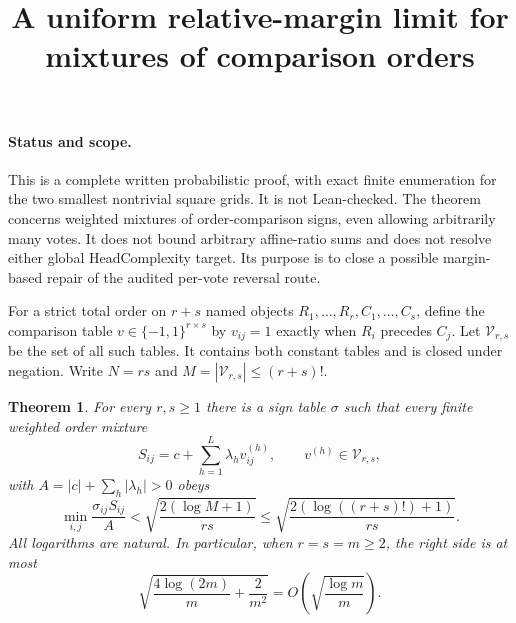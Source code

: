 \documentclass[11pt]{article}
\title{A uniform relative-margin limit for mixtures of comparison orders}
\author{}\date{}
\newtheorem{theorem}{Theorem}
\begin{document}
\maketitle

\paragraph{Status and scope.}
This is a complete written probabilistic proof, with exact finite
enumeration for the two smallest nontrivial square grids. It is not
Lean-checked. The theorem concerns weighted mixtures of order-comparison
signs, even allowing arbitrarily many votes. It does not bound arbitrary
affine-ratio sums and does not resolve either global HeadComplexity target.
Its purpose is to close a possible margin-based repair of the audited
per-vote reversal route.

For a strict total order on $r+s$ named objects
$R_1,\ldots,R_r,C_1,\ldots,C_s$, define the comparison table
$v\in\{-1,1\}^{r\times s}$ by $v_{ij}=1$ exactly when $R_i$ precedes
$C_j$. Let $\mathcal V_{r,s}$ be the set of all such tables. It contains
both constant tables and is closed under negation. Write $N=rs$ and
$M=|\mathcal V_{r,s}|\leq(r+s)!$.

\begin{theorem}
For every $r,s\geq1$ there is a sign table $\sigma$ such that every
finite weighted order mixture
\[
 S_{ij}=c+\sum_{h=1}^L\lambda_hv^{(h)}_{ij},
 \qquad v^{(h)}\in\mathcal V_{r,s},
\]
with $A=|c|+\sum_h|\lambda_h|>0$ obeys
\[
 \min_{i,j}\frac{\sigma_{ij}S_{ij}}A
 <\sqrt{\frac{2(\log M+1)}{rs}}
 \leq\sqrt{\frac{2(\log((r+s)!)+1)}{rs}}.                 \tag{1}
\]
All logarithms are natural. In particular, when $r=s=m\geq2$, the
right side is at most
\[
 \sqrt{\frac{4\log(2m)}m+\frac2{m^2}}
 =O\!\left(\sqrt{\frac{\log m}m}\right).                 \tag{2}
\]
\end{theorem}
\end{document}
